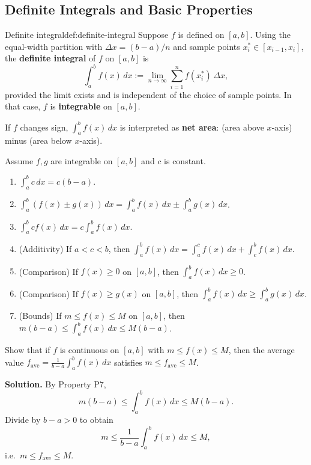 \subsection{Definite Integrals and Basic Properties}

\begin{definition}{Definite integral}{def:definite-integral}
Suppose $f$ is defined on $[a,b]$. Using the equal-width partition with $\Delta x=(b-a)/n$ and sample points $x_i^\ast\in[x_{i-1},x_i]$, the \textbf{definite integral} of $f$ on $[a,b]$ is
\[
\int_a^b f(x)\,dx := \lim_{n\to\infty}\sum_{i=1}^n f(x_i^\ast)\,\Delta x,
\]
provided the limit exists and is independent of the choice of sample points. In that case, $f$ is \textbf{integrable} on $[a,b]$.
\end{definition}

If $f$ changes sign, $\int_a^b f(x)\,dx$ is interpreted as \textbf{net area}: (area above $x$-axis) minus (area below $x$-axis).

\begin{keyformula}[title={Key Formula: Core properties of definite integrals}]
Assume $f,g$ are integrable on $[a,b]$ and $c$ is constant.
\begin{enumerate}[label=(P\arabic*), leftmargin=*]
\item $\displaystyle \int_a^b c\,dx = c(b-a)$.
\item $\displaystyle \int_a^b (f(x)\pm g(x))\,dx = \int_a^b f(x)\,dx \pm \int_a^b g(x)\,dx$.
\item $\displaystyle \int_a^b c f(x)\,dx = c\int_a^b f(x)\,dx$.
\item (Additivity) If $a<c<b$, then $\displaystyle \int_a^b f(x)\,dx = \int_a^c f(x)\,dx + \int_c^b f(x)\,dx$.
\item (Comparison) If $f(x)\ge 0$ on $[a,b]$, then $\displaystyle \int_a^b f(x)\,dx \ge 0$.
\item (Comparison) If $f(x)\ge g(x)$ on $[a,b]$, then $\displaystyle \int_a^b f(x)\,dx \ge \int_a^b g(x)\,dx$.
\item (Bounds) If $m\le f(x)\le M$ on $[a,b]$, then $\displaystyle m(b-a)\le \int_a^b f(x)\,dx \le M(b-a)$.
\end{enumerate}
\end{keyformula}

\begin{examplebox}[title={Worked Example: Average value satisfies its own bounds}]
Show that if $f$ is continuous on $[a,b]$ with $m\le f(x)\le M$, then the average value $\displaystyle f_{\mathrm{ave}}=\frac{1}{b-a}\int_a^b f(x)\,dx$ satisfies $m\le f_{\mathrm{ave}}\le M$.

\textbf{Solution.}
By Property P7,
\[
m(b-a)\le \int_a^b f(x)\,dx \le M(b-a).
\]
Divide by $b-a>0$ to obtain
\[
m \le \frac{1}{b-a}\int_a^b f(x)\,dx \le M,
\]
i.e.\ $m\le f_{\mathrm{ave}}\le M$.
\end{examplebox}

